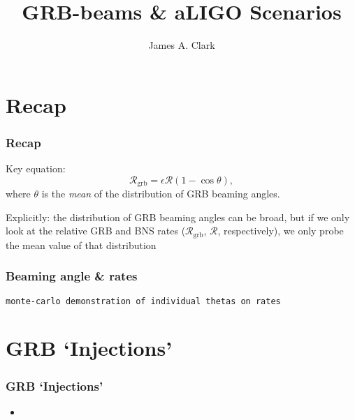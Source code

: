 \documentclass{beamer}
\newcommand{\grbrate}{{{\mathcal R}_{\mathrm{grb}}}}
\newcommand{\cbcrate}{{{\mathcal R}}}
\begin{document}
\title{GRB-beams \& aLIGO Scenarios}
\author{James A. Clark}
\date{} 

\begin{frame}[plain]
\titlepage
\end{frame}


\section{Recap}
\begin{frame}
\frametitle{Recap}
Key equation:
\begin{equation}\label{eq:rate2angle}
\grbrate=\epsilon\cbcrate(1-\cos \theta),
\end{equation}
where $\theta$ is the \emph{mean} of the distribution of GRB beaming angles.

Explicitly: the distribution of GRB beaming angles can be broad, but if we only
look at the relative GRB and BNS rates ($\grbrate$, $\cbcrate$, respectively),
we only probe the mean value of that distribution

\end{frame}

\begin{frame}
    \frametitle{Beaming angle \& rates}
    {\tt monte-carlo demonstration of individual thetas on rates}
\end{frame}

\section{GRB `Injections'}

\begin{frame}

    \frametitle{GRB `Injections'}
    \begin{itemize}
        \item 
    \end{itemize}

\end{frame}
\end{document}
